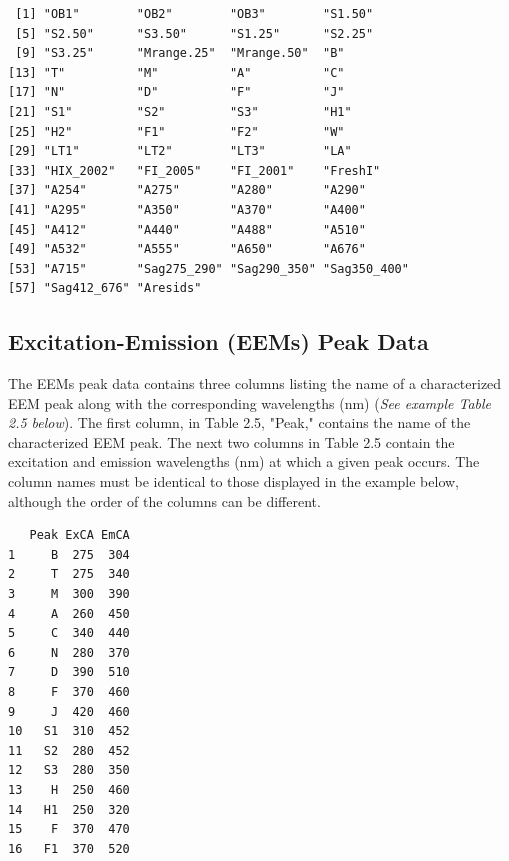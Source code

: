 \documentclass[a4paper,11pt]{article}\usepackage[]{graphicx}\usepackage[]{color}
\makeatletter
\newenvironment{kframe}{%
 \def\at@end@of@kframe{}%
 \ifinner\ifhmode%
  \def\at@end@of@kframe{\end{minipage}}%
  \begin{minipage}{\columnwidth}%
 \fi\fi%
 \def\FrameCommand##1{\hskip\@totalleftmargin \hskip-\fboxsep
 \colorbox{shadecolor}{##1}\hskip-\fboxsep
     \hskip-\linewidth \hskip-\@totalleftmargin \hskip\columnwidth}%
 \MakeFramed {\advance\hsize-\width
   \@totalleftmargin\z@ \linewidth\hsize
   \@setminipage}}%
 {\par\unskip\endMakeFramed%
 \at@end@of@kframe}
\newenvironment{knitrout}{}{} %
\makeatother
\begin{document}
\begin{knitrout}
\color{fgcolor}\begin{kframe}
\begin{verbatim}
 [1] "OB1"        "OB2"        "OB3"        "S1.50"     
 [5] "S2.50"      "S3.50"      "S1.25"      "S2.25"     
 [9] "S3.25"      "Mrange.25"  "Mrange.50"  "B"         
[13] "T"          "M"          "A"          "C"         
[17] "N"          "D"          "F"          "J"         
[21] "S1"         "S2"         "S3"         "H1"        
[25] "H2"         "F1"         "F2"         "W"         
[29] "LT1"        "LT2"        "LT3"        "LA"        
[33] "HIX_2002"   "FI_2005"    "FI_2001"    "FreshI"    
[37] "A254"       "A275"       "A280"       "A290"      
[41] "A295"       "A350"       "A370"       "A400"      
[45] "A412"       "A440"       "A488"       "A510"      
[49] "A532"       "A555"       "A650"       "A676"      
[53] "A715"       "Sag275_290" "Sag290_350" "Sag350_400"
[57] "Sag412_676" "Aresids"   
\end{verbatim}
\end{kframe}
\end{knitrout}

\subsection{Excitation-Emission (EEMs) Peak Data}
The EEMs peak data contains three columns listing the name of a characterized EEM peak along with the corresponding wavelengths (nm) (\emph{See example Table 2.5 below}). The first column, in Table 2.5, "Peak," contains the name of the characterized EEM peak. The next two columns in Table 2.5 contain the excitation and emission wavelengths (nm) at which a given peak occurs. The column names must be identical to those displayed in the example below, although the order of the columns can be different. 

\begin{knitrout}
\color{fgcolor}\begin{kframe}
\begin{verbatim}
   Peak ExCA EmCA
1     B  275  304
2     T  275  340
3     M  300  390
4     A  260  450
5     C  340  440
6     N  280  370
7     D  390  510
8     F  370  460
9     J  420  460
10   S1  310  452
11   S2  280  452
12   S3  280  350
13    H  250  460
14   H1  250  320
15    F  370  470
16   F1  370  520
\end{verbatim}
\end{kframe}
\end{knitrout}
\end{document}
